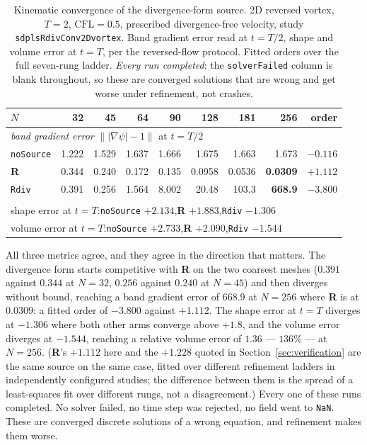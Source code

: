 \documentclass[preprint,3p,11pt]{elsarticle}
\newcommand{\psilev}{\psi}
\newcommand{\gradpsi}{\lvert\nabla\psilev\rvert}
\begin{document}
\begin{table}[htbp]
\centering
\caption{Kinematic convergence of the divergence-form source. 2D reversed vortex,
$T=2$, $\mathrm{CFL}=0.5$, prescribed divergence-free velocity, study
\texttt{sdplsRdivConv2Dvortex}. Band gradient error read at $t=T/2$, shape and
volume error at $t=T$, per the reversed-flow protocol. Fitted orders over the
full seven-rung ladder. \emph{Every run completed}: the \texttt{solverFailed}
column is blank throughout, so these are converged solutions that are wrong and
get worse under refinement, not crashes.}
\label{tab:rdiv-kinematic}
\small
\begin{tabular}{lrrrrrrrr}
\toprule
$N$ & 32 & 45 & 64 & 90 & 128 & 181 & 256 & order \\
\midrule
\multicolumn{9}{l}{\emph{band gradient error} $\bigl\|\gradpsi-1\bigr\|$ at $t=T/2$}\\
\texttt{noSource} & 1.222 & 1.529 & 1.637 & 1.666 & 1.675 & 1.663 & 1.673 & $-0.116$ \\
\textbf{R}        & 0.344 & 0.240 & 0.172 & 0.135 & 0.0958 & 0.0536 & \textbf{0.0309} & $\mathbf{+1.112}$ \\
\texttt{Rdiv}     & 0.391 & 0.256 & 1.564 & 8.002 & 20.48 & 103.3 & \textbf{668.9} & $\mathbf{-3.800}$ \\
\addlinespace
\multicolumn{9}{l}{\emph{fitted orders of the other two metrics}}\\
\multicolumn{9}{l}{shape error at $t=T$:\quad \texttt{noSource} $+2.134$,\quad \textbf{R} $+1.883$,\quad \texttt{Rdiv} $-1.306$} \\
\multicolumn{9}{l}{volume error at $t=T$:\quad \texttt{noSource} $+2.733$,\quad \textbf{R} $+2.090$,\quad \texttt{Rdiv} $-1.544$} \\
\bottomrule
\end{tabular}
\end{table}

All three metrics agree, and they agree in the direction that matters. The
divergence form starts competitive with \textbf{R} on the two coarsest meshes
($0.391$ against $0.344$ at $N=32$, $0.256$ against $0.240$ at $N=45$) and then
diverges without bound, reaching a band gradient error of $668.9$ at $N=256$
where \textbf{R} is at $0.0309$: a fitted order of $-3.800$ against $+1.112$. The
shape error at $t=T$ diverges at $-1.306$ where both other arms converge above
$+1.8$, and the volume error diverges at $-1.544$, reaching a relative volume
error of $1.36$ --- $136\%$ --- at $N=256$. (\textbf{R}'s $+1.112$ here and the
$+1.228$ quoted in Section~\ref{sec:verification} are the same source on the same
case, fitted over different refinement ladders in independently configured
studies; the difference between them is the spread of a least-squares fit over
different rungs, not a disagreement.) Every one of these runs completed. No
solver failed, no time step was rejected, no field went to \texttt{NaN}. These are
converged discrete solutions of a wrong equation, and refinement makes them
worse.
\end{document}
